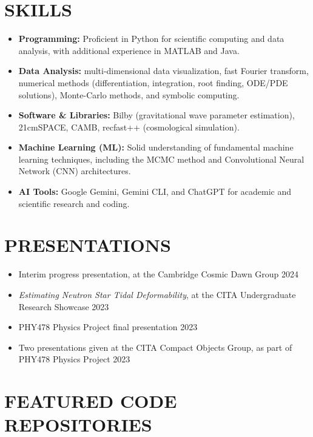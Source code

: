 \documentclass[a4paper,10pt]{extarticle}
\begin{document}
\section*{SKILLS}
\begin{itemize}
    \item \textbf{Programming:} Proficient in Python for scientific computing and data analysis, with additional experience in MATLAB and Java.
    \item \textbf{Data Analysis:} multi-dimensional data visualization, fast Fourier transform, numerical methods (differentiation, integration, root finding, ODE/PDE solutions), Monte-Carlo methods, and symbolic computing.
    \item \textbf{Software \& Libraries:} Bilby (gravitational wave parameter estimation), 21cmSPACE, CAMB, recfast++ (cosmological simulation).
    \item \textbf{Machine Learning (ML):} Solid understanding of fundamental machine learning techniques, including the MCMC method and Convolutional Neural Network (CNN) architectures. 
    
    \item \textbf{AI Tools:} Google Gemini, Gemini CLI, and ChatGPT for academic and scientific research and coding.
\end{itemize}

\section*{PRESENTATIONS}
\begin{itemize}
    \item Interim progress presentation, at the Cambridge Cosmic Dawn Group \hfill 2024

    \item \textit{Estimating Neutron Star Tidal Deformability}, at the CITA Undergraduate Research Showcase \hfill 2023

    \item PHY478 Physics Project final presentation \hfill 2023

    \item Two presentations given at the CITA Compact Objects Group, as part of PHY478 Physics Project \hfill 2023
\end{itemize}

\section*{FEATURED CODE REPOSITORIES}
\end{document}
